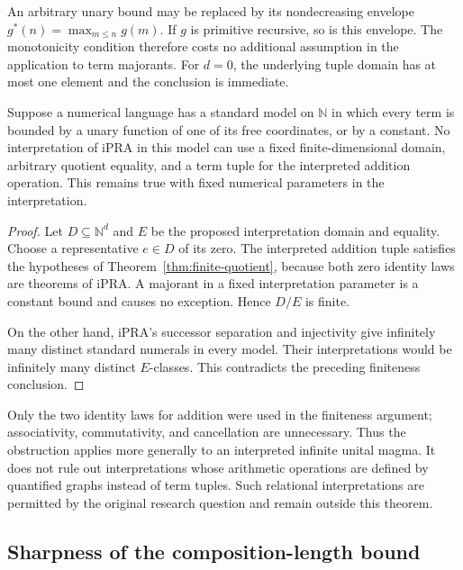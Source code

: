 An arbitrary unary bound may be replaced by its nondecreasing envelope
$g^*(n)=\max_{m\leq n}g(m)$. If $g$ is primitive recursive, so is this
envelope. The monotonicity condition therefore costs no additional
assumption in the application to term majorants. For $d=0$, the
underlying tuple domain has at most one element and the conclusion is
immediate.

\begin{corollary}
\label{cor:no-term-interpretation}
Suppose a numerical language has a standard model on $\mathbb N$ in
which every term is bounded by a unary function of one of its free
coordinates, or by a constant. No interpretation of iPRA in this
model can use a fixed finite-dimensional domain, arbitrary quotient
equality, and a term tuple for the interpreted addition operation.
This remains true with fixed numerical parameters in the
interpretation.
\end{corollary}

\begin{proof}
Let $D\subseteq\mathbb N^d$ and $E$ be the proposed interpretation
domain and equality. Choose a representative $e\in D$ of its zero.
The interpreted addition tuple satisfies the hypotheses of
Theorem~\ref{thm:finite-quotient}, because both zero identity laws are
theorems of iPRA. A majorant in a fixed interpretation parameter is a
constant bound and causes no exception. Hence $D/E$ is finite.

On the other hand, iPRA's successor separation and injectivity give
infinitely many distinct standard numerals in every model. Their
interpretations would be infinitely many distinct $E$-classes. This
contradicts the preceding finiteness conclusion.
\end{proof}

Only the two identity laws for addition were used in the finiteness
argument; associativity, commutativity, and cancellation are unnecessary.
Thus the obstruction applies more generally to an interpreted infinite
unital magma. It does not rule out interpretations whose arithmetic
operations are defined by quantified graphs instead of term tuples.
Such relational interpretations are permitted by the original research
question and remain outside this theorem.

\subsection{Sharpness of the composition-length bound}

